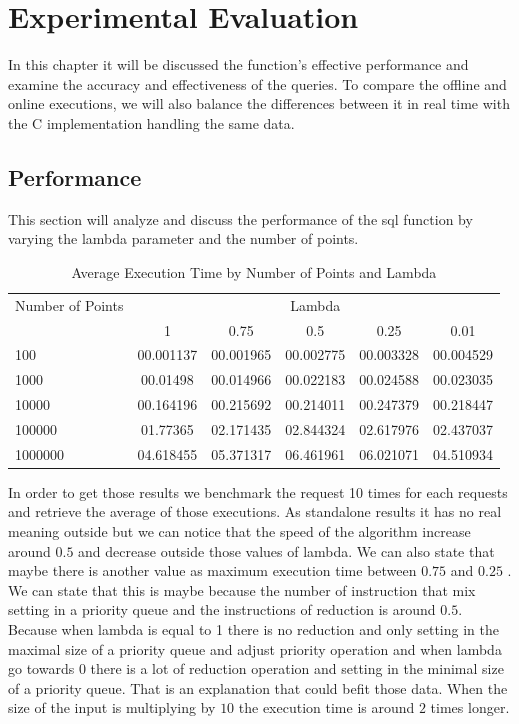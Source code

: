 
\chapter{Experimental Evaluation}

In this chapter it will be discussed the function's effective performance and examine the accuracy and effectiveness of the queries. To compare the offline and online executions, we will also balance the differences between it in real time with the C implementation handling the same data.

\section{Performance}
This section will analyze and discuss the performance of the sql function by varying the lambda parameter and the number of points.
\begin{table}[htbp]
    \centering
    \label{tab:execution_time}
    \begin{tabular}{@{}lccccc@{}}
        \toprule
        Number of Points & \multicolumn{5}{c}{Lambda} \\
        \cmidrule{2-6}
        & 1         & 0.75       & 0.5        & 0.25       & 0.01       \\
        \midrule
        100              & 00.001137 & 00.001965 & 00.002775 & 00.003328 & 00.004529 \\
        1000             & 00.01498  & 00.014966 & 00.022183 & 00.024588 & 00.023035 \\
        10000            & 00.164196 & 00.215692 & 00.214011 & 00.247379 & 00.218447 \\
        100000           & 01.77365  & 02.171435 & 02.844324 & 02.617976 & 02.437037 \\
        1000000          & 04.618455 & 05.371317 & 06.461961 & 06.021071 & 04.510934 \\
        \bottomrule
    \end{tabular}
    \caption{Average Execution Time by Number of Points and Lambda}
\end{table}

In order to get those results we benchmark the request 10 times for each requests and retrieve the average of those executions. As standalone results it has no real meaning outside but we can notice that the speed of the algorithm increase around $0.5$ and decrease outside those values of lambda. We can also state that maybe there is another value as maximum execution time between $0.75$ and $0.25$ . We can state that this is maybe because the number of instruction that mix setting in a priority queue and the instructions of reduction is around $0.5$. Because when lambda is equal to 1 there is no reduction and only setting in the maximal size of a priority queue and adjust priority operation and when lambda go towards $0$ there is a lot of reduction operation and setting in the minimal size of a priority queue. That is an explanation that could befit those data. When the size of the input is multiplying by $10$ the execution time is around $2$ times longer.


